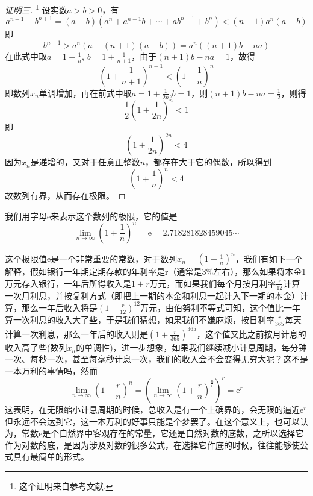 \begin{proof}[证明三]\footnote{这个证明来自参考文献\cite{math-analysis}.}
  设实数$a>b>0$，有
  \[ a^{n+1}-b^{n+1}=(a-b)(a^n+a^{n-1}b+\cdots+ab^{n-1}+b^n) < (n+1)a^n(a-b) \]
  即
  \begin{equation}
    \label{eq:example-equation-a-n-b-n}
   b^{n+1}>a^n(a-(n+1)(a-b))=a^n((n+1)b-na) 
  \end{equation}
  在此式中取$a=1+\frac{1}{n}$, $b=1+\frac{1}{n+1}$，由于$(n+1)b-na=1$，故得
  \[ \left( 1+\frac{1}{n+1} \right)^{n+1} < \left( 1+\frac{1}{n} \right)^n \]
  即数列$x_n$单调增加，再在前式中取$a=1+\frac{1}{2n}$,$b=1$，则$(n+1)b-na=\frac{1}{2}$，则得
  \[ \frac{1}{2} \left( 1 + \frac{1}{2n} \right)^n < 1 \]
  即
  \[ \left( 1 + \frac{1}{2n} \right)^{2n} < 4 \]
  因为$x_n$是递增的，又对于任意正整数$n$，都存在大于它的偶数，所以得到
  \[ \left( 1 + \frac{1}{n} \right)^n < 4 \]
  故数列有界，从而存在极限。
\end{proof}

我们用字母$\mathrm{e}$来表示这个数列的极限，它的值是
\[ \lim_{n \to \infty} \left( 1+\frac{1}{n} \right)^n = \mathrm{e}= 2.718281828459045\cdots \]

\begin{example}
  这个极限值$\mathrm{e}$是一个非常重要的常数，对于数列$x_n=\left( 1+\frac{1}{n} \right)^n$，我们有如下一个解释，假如银行一年期定期存款的年利率是r（通常是3\%左右），那么如果将本金1万元存入银行，一年后所得收入是$1+r$万元，而如果我们每个月按月利率$\frac{r}{12}$计算一次月利息，并按复利方式（即把上一期的本金和利息一起计入下一期的本金）计算，那么一年后收入将是$\left( 1+\frac{r}{12} \right)^{12}$万元，由伯努利不等式可知，这个值比一年算一次利息的收入大了些，于是我们猜想，如果我们不嫌麻烦，按日利率$\frac{r}{365}$每天计算一次利息，那么一年后的收入则是$\left( 1+\frac{r}{365} \right)^{365}$，这个值又比之前按月计息的收入高了些(数列$x_n$的单调性)，进一步想象，如果我们继续减小计息周期，每分钟一次、每秒一次，甚至每毫秒计息一次，我们的收入会不会变得无穷大呢？这不是一本万利的事情吗，然而
  \[ \lim_{n \to \infty} \left( 1+\frac{r}{n} \right)^n = \left( \lim_{n \to \infty} \left( 1+\frac{r}{n} \right)^{\frac{n}{r}} \right)^r = \mathrm{e}^r \]
  这表明，在无限缩小计息周期的时候，总收入是有一个上确界的，会无限的逼近$\mathrm{e}^r$但永远不会达到它，这一本万利的好事只能是个梦罢了。在这个意义上，也可以认为，常数$\mathrm{e}$是个自然界中客观存在的常量，它还是自然对数的底数，之所以选择它作为对数的底，是因为涉及对数的很多公式，在选择它作底的时候，往往能够使公式具有最简单的形式。
\end{example}

